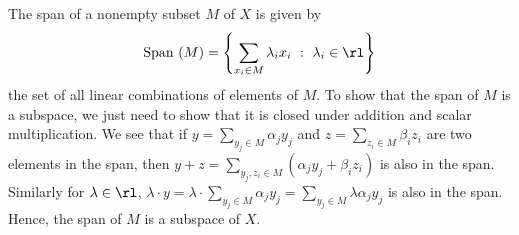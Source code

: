 \begin{solution}
    
    The span of a nonempty subset $M$ of $X$ is
    given by
    $$\text{Span }(M)=\left\{\sum_{x_i\in M}{\lambda_ix_i\ :
    \ \lambda_i\in\rl}\right\}$$
    the set of all linear combinations of elements of $M$.
    To show that the span of $M$ is a subspace, we just
    need to show that it is closed under addition and
    scalar multiplication. We see that if
    $y=\sum_{y_j\in M}{\alpha_jy_j}$ and
    $z=\sum_{z_i\in M}{\beta_iz_i}$ are two elements
    in the span, then $y+z=\sum_{y_j, z_i\in M}
    {(\alpha_jy_j+\beta_iz_i)}$ is also in the span.
    Similarly for $\lambda\in\rl$, $\lambda\cdot y=
    \lambda\cdot \sum_{y_j\in M}{\alpha_jy_j}=
    \sum_{y_j\in M}{\lambda\alpha_jy_j}$ is also in the
    span. Hence, the span of $M$ is a subspace of $X$.

\end{solution}